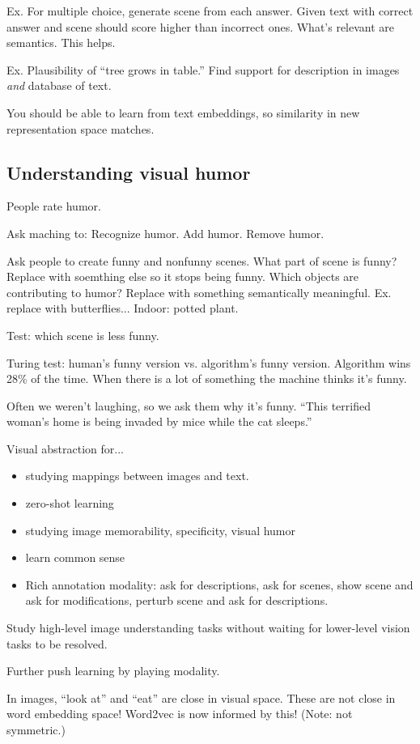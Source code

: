Ex. For multiple choice, generate scene from each answer. Given text with correct answer and scene should score higher than incorrect ones.
What's relevant are semantics. 
This helps.

Ex. Plausibility of ``tree grows in table.'' Find support for description in images \emph{and} database of text.


You should be able to learn from text embeddings, so similarity in new representation space matches.

\subsection{Understanding visual humor}

People rate humor. 

Ask maching to: Recognize humor. Add humor. Remove humor.

Ask people to create funny and nonfunny scenes. What part of scene is funny? Replace with soemthing else so it stops being funny. Which objects are contributing to humor? Replace with something semantically meaningful. Ex. replace with butterflies... Indoor: potted plant.

Test: which scene is less funny.

Turing test: human's funny version vs. algorithm's funny version. Algorithm wins 28\% of the time. When there is a lot of something the machine thinks it's funny.

Often we weren't laughing, so we ask them why it's funny. ``This terrified woman's home is being invaded by mice while the cat sleeps.''

Visual abstraction for...
\begin{itemize}
\item
studying mappings between images and text.
\item
zero-shot learning
\item studying image memorability, specificity, visual humor
\item learn common sense
\item
Rich annotation modality: ask for descriptions, ask for scenes, show scene and ask for modifications, perturb scene and ask for descriptions. 
\end{itemize}
Study high-level image understanding tasks without waiting for lower-level vision tasks to be resolved.

Further push learning by playing modality.

In images, ``look at'' and ``eat'' are close in visual space. These are not close in word embedding space!
Word2vec is now informed by this!
(Note: not symmetric.)



